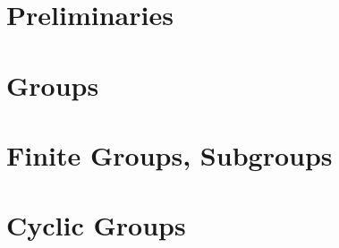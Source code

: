 \documentclass[12pt]{report}
\begin{document}
  

  \setcounter{chapter}{-1}

  \chapter{Preliminaries}
  


  \setcounter{chapter}{1}

  \chapter{Groups}
  

  \chapter{Finite Groups, Subgroups}
  

  \chapter{Cyclic Groups}
  
\end{document}
